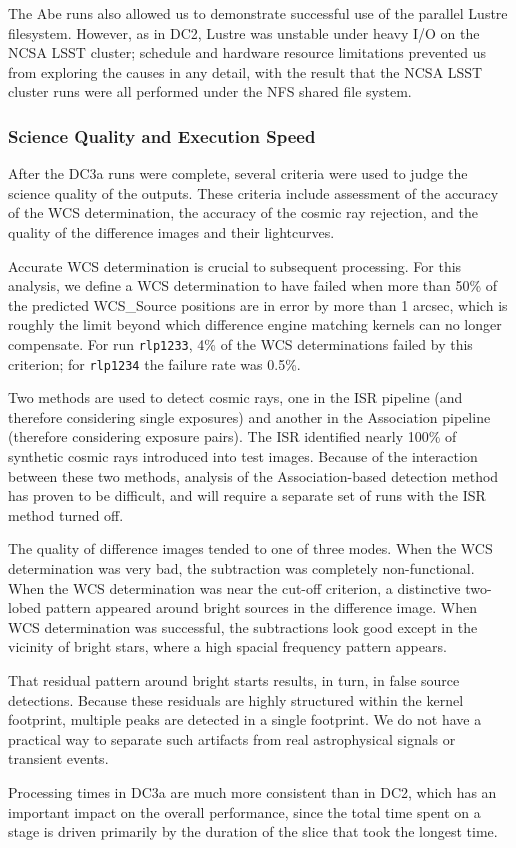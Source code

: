 The Abe runs also allowed us to demonstrate successful use of the 
parallel Lustre filesystem. However, as in DC2, Lustre was unstable 
under heavy I/O on the NCSA LSST cluster; schedule and hardware
resource limitations prevented us from exploring the causes in 
any detail, with the result that the NCSA LSST cluster runs were all
performed under the NFS shared file system. 

\subsubsection*{Science Quality and Execution Speed}

After the DC3a runs were complete, several criteria were used to judge 
the science quality of the outputs. These criteria include assessment
of the accuracy of the WCS determination, the accuracy of the
cosmic ray rejection, and the quality of the difference images and their
lightcurves.

Accurate WCS determination is crucial to subsequent processing.
For this analysis, we define a WCS determination to have failed
when more than 50\% of the predicted WCS\_Source positions are
in error by more than 1 arcsec, which is roughly the limit beyond
which difference engine matching kernels can no longer compensate.
For run \texttt{rlp1233}, 4\% of the WCS determinations failed
by this criterion; for \texttt{rlp1234} the failure rate was 0.5\%.

Two methods are used to detect cosmic rays, one in the ISR
pipeline (and therefore considering single exposures) and another 
in the Association pipeline (therefore considering exposure pairs). 
The ISR identified nearly 100\% of synthetic cosmic rays introduced into test
images. Because of the interaction between these two methods,
analysis of the Association-based detection method has proven
to be difficult, and will require a separate set of runs with
the ISR method turned off.

The quality of difference images tended to one of three modes.
When the WCS determination was very bad, the subtraction was
completely non-functional. When the WCS determination was
near the cut-off criterion, a distinctive two-lobed pattern appeared
around bright sources in the difference image. When WCS determination
was successful, the subtractions look good except in the vicinity
of bright stars, where a high spacial frequency pattern appears.

That residual pattern around bright starts results, in turn, 
in false source detections. Because these residuals are highly
structured within the kernel footprint, multiple peaks are detected
in a single footprint. We do not have a practical way to separate
such artifacts from real astrophysical signals or transient events.

Processing times in DC3a are much more consistent than in DC2,
which has an important impact on the overall performance, since
the total time spent on a stage is driven primarily by the duration
of the slice that took the longest time.



